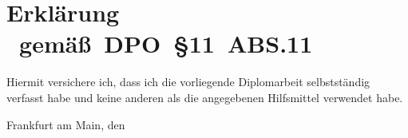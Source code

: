 \chapter*{Erklärung~~~~~\\\tiny ~gemäß~DPO~§11~ABS.11}


Hiermit versichere ich, dass ich die vorliegende Diplomarbeit %
selbstständig verfasst habe und keine anderen als die angegebenen
Hilfsmittel verwendet habe.

\vspace{3cm}

\begin{flushleft}
Frankfurt am Main, den \Date
\hspace{25mm} \Author
\end{flushleft}
